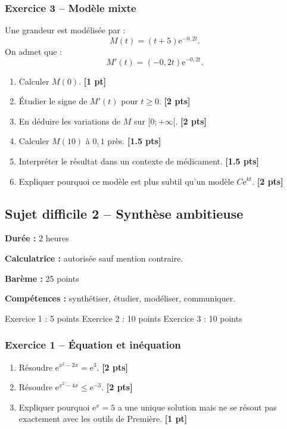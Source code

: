 \documentclass[11pt,a4paper]{article}
\newcommand{\e}{\mathrm{e}}
\newcommand{\pts}[1]{\hfill \textbf{[#1 pt]}}
\newcommand{\ptss}[1]{\hfill \textbf{[#1 pts]}}
\newcommand{\competences}[1]{\textbf{Compétences :} #1}
\newcommand{\calculatrice}{\textbf{Calculatrice :} autorisée sauf mention contraire.}
\newcommand{\duree}[1]{\textbf{Durée :} #1}
\newcommand{\bareme}[1]{\textbf{Barème :} #1}
\begin{document}
\subsubsection*{Exercice 3 -- Modèle mixte}

Une grandeur est modélisée par :
\[
M(t)=(t+5)\e^{-0,2t}.
\]
On admet que :
\[
M'(t)=(-0,2t)\e^{-0,2t}.
\]
\begin{enumerate}
    \item Calculer $M(0)$. \pts{1}
    \item Étudier le signe de $M'(t)$ pour $t\geq 0$. \ptss{2}
    \item En déduire les variations de $M$ sur $[0;+\infty[$. \ptss{2}
    \item Calculer $M(10)$ à $0,1$ près. \ptss{1.5}
    \item Interpréter le résultat dans un contexte de médicament. \ptss{1.5}
    \item Expliquer pourquoi ce modèle est plus subtil qu'un modèle $C\e^{kt}$. \ptss{2}
\end{enumerate}

\newpage

\subsection*{Sujet difficile 2 -- Synthèse ambitieuse}

\begin{sujetbox}
\duree{2 heures}

\calculatrice

\bareme{25 points}

\competences{synthétiser, étudier, modéliser, communiquer.}
\end{sujetbox}

\begin{baremebox}
Exercice 1 : 5 points \quad
Exercice 2 : 10 points \quad
Exercice 3 : 10 points
\end{baremebox}

\subsubsection*{Exercice 1 -- Équation et inéquation}

\begin{enumerate}
    \item Résoudre $\e^{x^2-2x}=\e^3$. \ptss{2}
    \item Résoudre $\e^{x^2-4x}\leq \e^{-3}$. \ptss{2}
    \item Expliquer pourquoi $\e^x=5$ a une unique solution mais ne se résout pas exactement avec les outils de Première. \pts{1}
\end{enumerate}
\end{document}
